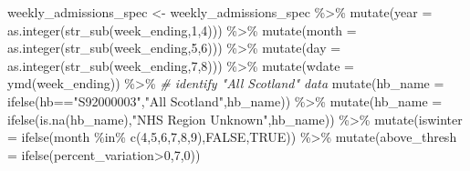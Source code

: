 \documentclass[
]{article}
\newenvironment{Shaded}{\begin{snugshade}}{\end{snugshade}}
\newcommand{\AttributeTok}[1]{\textcolor[rgb]{0.77,0.63,0.00}{#1}}
\newcommand{\CommentTok}[1]{\textcolor[rgb]{0.56,0.35,0.01}{\textit{#1}}}
\newcommand{\ConstantTok}[1]{\textcolor[rgb]{0.00,0.00,0.00}{#1}}
\newcommand{\DecValTok}[1]{\textcolor[rgb]{0.00,0.00,0.81}{#1}}
\newcommand{\FunctionTok}[1]{\textcolor[rgb]{0.00,0.00,0.00}{#1}}
\newcommand{\NormalTok}[1]{#1}
\newcommand{\OtherTok}[1]{\textcolor[rgb]{0.56,0.35,0.01}{#1}}
\newcommand{\SpecialCharTok}[1]{\textcolor[rgb]{0.00,0.00,0.00}{#1}}
\newcommand{\StringTok}[1]{\textcolor[rgb]{0.31,0.60,0.02}{#1}}
\begin{document}
\begin{Shaded}
\begin{Highlighting}[]
\NormalTok{weekly\_admissions\_spec }\OtherTok{\textless{}{-}}\NormalTok{ weekly\_admissions\_spec }\SpecialCharTok{\%\textgreater{}\%} 
  \FunctionTok{mutate}\NormalTok{(}\AttributeTok{year =} \FunctionTok{as.integer}\NormalTok{(}\FunctionTok{str\_sub}\NormalTok{(week\_ending,}\DecValTok{1}\NormalTok{,}\DecValTok{4}\NormalTok{))) }\SpecialCharTok{\%\textgreater{}\%} 
  \FunctionTok{mutate}\NormalTok{(}\AttributeTok{month =} \FunctionTok{as.integer}\NormalTok{(}\FunctionTok{str\_sub}\NormalTok{(week\_ending,}\DecValTok{5}\NormalTok{,}\DecValTok{6}\NormalTok{))) }\SpecialCharTok{\%\textgreater{}\%} 
  \FunctionTok{mutate}\NormalTok{(}\AttributeTok{day =} \FunctionTok{as.integer}\NormalTok{(}\FunctionTok{str\_sub}\NormalTok{(week\_ending,}\DecValTok{7}\NormalTok{,}\DecValTok{8}\NormalTok{))) }\SpecialCharTok{\%\textgreater{}\%} 
  \FunctionTok{mutate}\NormalTok{(}\AttributeTok{wdate =} \FunctionTok{ymd}\NormalTok{(week\_ending)) }\SpecialCharTok{\%\textgreater{}\%} 
  \CommentTok{\# identify "All Scotland" data}
  \FunctionTok{mutate}\NormalTok{(}\AttributeTok{hb\_name =} \FunctionTok{ifelse}\NormalTok{(hb}\SpecialCharTok{==}\StringTok{"S92000003"}\NormalTok{,}\StringTok{"All Scotland"}\NormalTok{,hb\_name)) }\SpecialCharTok{\%\textgreater{}\%} 
  \FunctionTok{mutate}\NormalTok{(}\AttributeTok{hb\_name =} \FunctionTok{ifelse}\NormalTok{(}\FunctionTok{is.na}\NormalTok{(hb\_name),}\StringTok{"NHS Region Unknown"}\NormalTok{,hb\_name)) }\SpecialCharTok{\%\textgreater{}\%} 
  \FunctionTok{mutate}\NormalTok{(}\AttributeTok{iswinter =} \FunctionTok{ifelse}\NormalTok{(month }\SpecialCharTok{\%in\%} \FunctionTok{c}\NormalTok{(}\DecValTok{4}\NormalTok{,}\DecValTok{5}\NormalTok{,}\DecValTok{6}\NormalTok{,}\DecValTok{7}\NormalTok{,}\DecValTok{8}\NormalTok{,}\DecValTok{9}\NormalTok{),}\ConstantTok{FALSE}\NormalTok{,}\ConstantTok{TRUE}\NormalTok{)) }\SpecialCharTok{\%\textgreater{}\%} 
  \FunctionTok{mutate}\NormalTok{(}\AttributeTok{above\_thresh =} \FunctionTok{ifelse}\NormalTok{(percent\_variation}\SpecialCharTok{\textgreater{}}\DecValTok{0}\NormalTok{,}\DecValTok{7}\NormalTok{,}\DecValTok{0}\NormalTok{))}
\end{Highlighting}
\end{Shaded}
\end{document}
